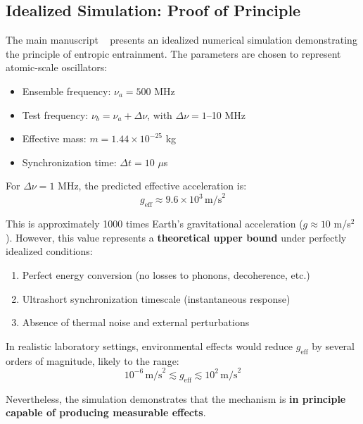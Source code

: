 \documentclass[12pt,letterpaper]{article}
\begin{document}
\subsection{Idealized Simulation: Proof of Principle}
\label{subsec:idealized_simulation}

The main manuscript ~\cite{Hanamura2026geometrical} presents an idealized numerical simulation demonstrating the principle of entropic entrainment. The parameters are chosen to represent atomic-scale oscillators:
\begin{itemize}
\item Ensemble frequency: $\nu_a = 500$ MHz
\item Test frequency: $\nu_b = \nu_a + \Delta\nu$, with $\Delta\nu = 1$--10 MHz
\item Effective mass: $m = 1.44 \times 10^{-25}$ kg
\item Synchronization time: $\Delta t = 10$ $\mu$s
\end{itemize}

For $\Delta\nu = 1$ MHz, the predicted effective acceleration is:
\begin{equation}
g_\text{eff} \approx 9.6 \times 10^3 \, \text{m/s}^2
\end{equation}

This is approximately 1000 times Earth's gravitational acceleration ($g \approx 10$ m/s$^2$). However, this value represents a \textbf{theoretical upper bound} under perfectly idealized conditions:
\begin{enumerate}
\item Perfect energy conversion (no losses to phonons, decoherence, etc.)
\item Ultrashort synchronization timescale (instantaneous response)
\item Absence of thermal noise and external perturbations
\end{enumerate}

In realistic laboratory settings, environmental effects would reduce $g_\text{eff}$ by several orders of magnitude, likely to the range:
\begin{equation}
10^{-6} \, \text{m/s}^2 \lesssim g_\text{eff} \lesssim 10^{2} \, \text{m/s}^2
\end{equation}

Nevertheless, the simulation demonstrates that the mechanism is \textbf{in principle capable of producing measurable effects}.

\end{document}
